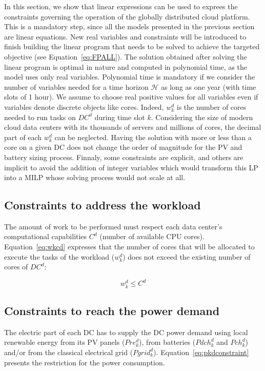 In this section, we show that linear expressions can be used to exprees the constraints governing the operation of the globally distributed cloud platform. This is a mandatory step, since all the models presented in the previous section are linear equations. New real variables and constraints will be introduced to finish building the linear program that needs to be solved to achieve the targeted objective (see Equation~\eqref{eq:FPALL}). The solution obtained after solving the linear program is optimal in nature and computed in polynomial time, as the model uses only real variables. Polynomial time is mandatory if we consider the number of variables needed for a time horizon $\mathcal{H}$ as long as one year (with time slots of 1 hour). We assume to choose real positive values for all variables even if variables denote discrete objects like cores. Indeed, $w_k^d$ is the number of cores needed to run tasks on $DC^d$ during time slot $k$. Considering the size of modern cloud data centers with its thousands of servers and millions of cores, the decimal part of each $w_k^d$ can be neglected. Having the solution with more or less than a core on a given DC does not change the order of magnitude for the PV and battery sizing process. Finnaly, some constraints are explicit, and others are implicit to avoid the addition of integer variables which would transform this LP into a MILP whose solving process would not scale at all.


\subsection{Constraints to address the workload}

The amount of work to be performed must respect each data center's computational capabilities $C^d$ (number of available CPU cores). Equation~\eqref{eq:wkcd} expresses that the number of cores that will be allocated to execute the tasks of the workload ($w_k^d$) does not exceed the existing number of cores of $DC^d$:

\begin{equation}\label{eq:wkcd}
    w_k^d \leq C^d
\end{equation}


\subsection{Constraints to reach the power demand}

The electric part of each DC has to supply the DC power demand using local renewable energy from its PV panels ($Pre_k^d$), from batteries ($Pdch_k^d$ and $Pch_k^d$) and/or from the classical electrical grid ($Pgrid_k^d$). Equation~\eqref{eq:pkdconstraint} presents the restriction for the power consumption.

